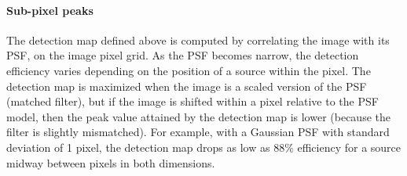 \documentclass[11pt,letterpaper,linenumbers]{aastex63}
\newcommand{\doctype}{paper}
\begin{document}
%














\paragraph{Sub-pixel peaks}  The detection map defined above
is computed by correlating the image with its PSF, on the image pixel
grid.  As the PSF becomes narrow, the detection efficiency varies
depending on the position of a source within the pixel.  The detection
map is maximized when the image is a scaled version of the PSF
(matched filter), but if the image is shifted within a pixel relative
to the PSF model, then the peak value attained by the detection map is
lower (because the filter is slightly mismatched).  For example, with
a Gaussian PSF with standard deviation of 1 pixel, the detection map
drops as low as 88\% efficiency for a source midway between pixels in
both dimensions.
\end{document}
